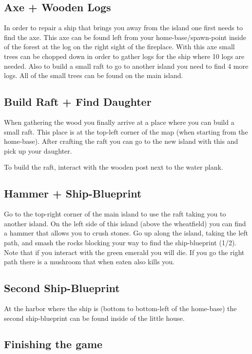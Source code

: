 \documentclass[a4paper]{scrreprt}
\begin{document}
\subsection{Axe + Wooden Logs}

In order to repair a ship that brings you away from the island one first needs to find the axe. This axe can be found left from your home-base/spawn-point inside of the forest at the log on the right sight of the fireplace.
With this axe small trees can be chopped down in order to gather logs for the ship where 10 logs are needed. Also to build a small raft to go to another island you need to find 4 more logs. All of the small trees can be found on the main island.

\subsection{Build Raft + Find Daughter}

When gathering the wood you finally arrive at a place where you can build a small raft. This place is at the top-left corner of the map (when starting from the home-base). After crafting the raft you can go to the new island with this and pick up your daughter.

To build the raft, interact with the wooden post next to the water plank.

\subsection{Hammer + Ship-Blueprint}

Go to the top-right corner of the main island to use the raft taking you to another island. On the left side of this island (above the wheatfield) you can find a hammer that allows you to crush stones. Go up along the island, taking the left path, and smash the rocks blocking your way to find the ship-blueprint (1/2).
Note that if you interact with the green emerald you will die.
If you go the right path there is a mushroom that when eaten also kills you.

\subsection{Second Ship-Blueprint}

At the harbor where the ship is (bottom to bottom-left of the home-base) the second ship-blueprint can be found inside of the little house.

\subsection{Finishing the game}
\end{document}
